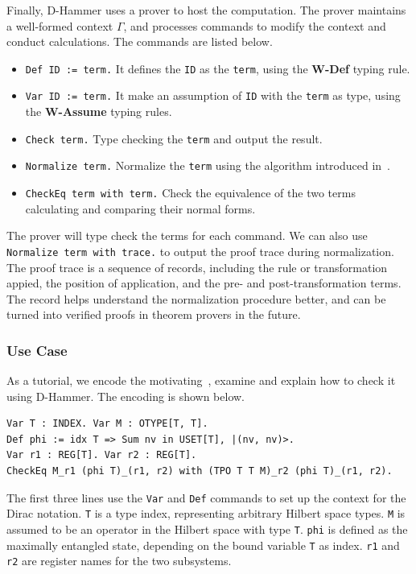 Finally, D-Hammer uses a prover to host the computation. The prover maintains a well-formed context $\Gamma$, and processes commands to modify the context and conduct calculations. The commands are listed below.
\begin{itemize}
    \item \texttt{\textcolor{NavyBlue}{Def} ID := term.} It defines the \texttt{ID} as the \texttt{term}, using the \textbf{W-Def} typing rule.
    \item \texttt{\textcolor{NavyBlue}{Var} ID := term.} It make an assumption of \texttt{ID} with the \texttt{term} as type, using the \textbf{W-Assume} typing rules.
    \item \texttt{\textcolor{NavyBlue}{Check} term.} Type checking the \texttt{term} and output the result.
    \item \texttt{\textcolor{NavyBlue}{Normalize} term.} Normalize the \texttt{term} using the algorithm introduced in~.
    \item \texttt{\textcolor{NavyBlue}{CheckEq} term \textcolor{NavyBlue}{with} term.} Check the equivalence of the two terms calculating and comparing their normal forms.
\end{itemize}
The prover will type check the terms for each command. We can also use \texttt{\textcolor{NavyBlue}{Normalize} term \textcolor{NavyBlue}{with trace}.} to output the proof trace during normalization. The proof trace is a sequence of records, including the rule or transformation appied, the position of application, and the pre- and post-transformation terms. The record helps understand the normalization procedure better, and can be turned into verified proofs in theorem provers in the future.


\subsubsection{Use Case}
As a tutorial, we encode the motivating~, examine and explain how to check it using D-Hammer. The encoding is shown below.

    \begin{lstlisting}[style=dhammer]
Var T : INDEX. Var M : OTYPE[T, T].
Def phi := idx T => Sum nv in USET[T], |(nv, nv)>.
Var r1 : REG[T]. Var r2 : REG[T].
CheckEq M_r1 (phi T)_(r1, r2) with (TPO T T M)_r2 (phi T)_(r1, r2).
    \end{lstlisting}        

The first three lines use the \texttt{\textcolor{NavyBlue}{Var}} and \texttt{\textcolor{NavyBlue}{Def}} commands to set up the context for the Dirac notation.
\texttt{T} is a type index, representing arbitrary Hilbert space types. \texttt{M} is assumed to be an operator in the Hilbert space with type \texttt{T}. \texttt{phi} is defined as the maximally entangled state, depending on the bound variable \texttt{T} as index.
\texttt{r1} and \texttt{r2} are register names for the two subsystems.

